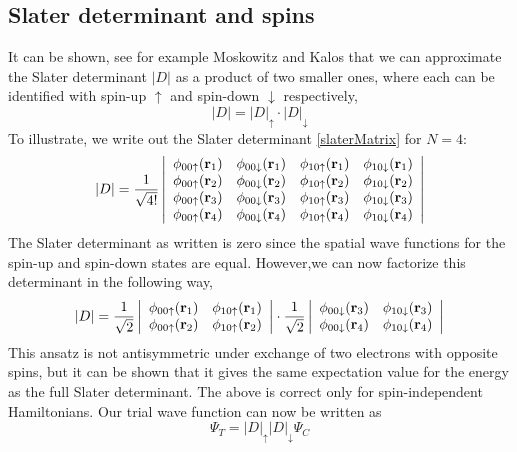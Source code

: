 \documentclass[english, a4paper]{article}
\begin{document}
\subsection{Slater determinant and spins}

It can be shown, see for example Moskowitz and Kalos \cite{ref3} that we can approximate the Slater
determinant $|D|$ as a product of two smaller ones, where each can be identified with
spin-up $\uparrow$ and spin-down $\downarrow$ respectively,
\begin{equation}
 |D| = |D|_\uparrow \cdot |D|_\downarrow
\end{equation}
To illustrate, we write out the Slater determinant \eqref{slaterMatrix} for $N=4$:
\begin{equation}
    |D| = \frac{1}{\sqrt{4!}} \left|\begin{array}{cccc}
\phi_{00\uparrow}({\bf r}_1) &\phi_{00\downarrow}({\bf r}_1) 
&\phi_{10\uparrow}({\bf r}_1) &\phi_{10\downarrow}({\bf r}_1) \\
\phi_{00\uparrow}({\bf r}_2) &\phi_{00\downarrow}({\bf r}_2) 
&\phi_{10\uparrow}({\bf r}_2) &\phi_{10\downarrow}({\bf r}_2) \\
\phi_{00\uparrow}({\bf r}_3) &\phi_{00\downarrow}({\bf r}_3) 
&\phi_{10\uparrow}({\bf r}_3) &\phi_{10\downarrow}({\bf r}_3) \\
\phi_{00\uparrow}({\bf r}_4) &\phi_{00\downarrow}({\bf r}_4) 
&\phi_{10\uparrow}({\bf r}_4) &\phi_{10\downarrow}({\bf r}_4) \\
                      \end{array} \right|
\end{equation}
The Slater determinant as written is zero since the spatial wave functions for the
spin-up and spin-down states are equal. 
However,we can now factorize this determinant in the following way,
\begin{equation}
|D| = \frac{1}{\sqrt{2}}\left|\begin{array}{cc}
\phi_{00\uparrow}({\bf r}_1) &\phi_{10\uparrow}({\bf r}_1) \\
\phi_{00\uparrow}({\bf r}_2) &\phi_{10\uparrow}({\bf r}_2) \\
            \end{array} \right|
\cdot
\frac{1}{\sqrt{2}} \left| \begin{array}{cc}
\phi_{00\downarrow}({\bf r}_3) &\phi_{10\downarrow}({\bf r}_3) \\
\phi_{00\downarrow}({\bf r}_4) &\phi_{10\downarrow}({\bf r}_4) \\
       \end{array} \right|
       \label{SlaterDetFactorized}
\end{equation}
This ansatz is not antisymmetric under exchange of two electrons with opposite spins, but it can 
be shown that it gives the same expectation value for the energy as the full Slater determinant. 
The above is correct only for spin-independent Hamiltonians. Our trial wave function
can now be written as
\begin{equation}
 \Psi_T = |D|_\uparrow |D|_\downarrow \Psi_C
 \label{TrialWFSpins}
\end{equation}
\end{document}
